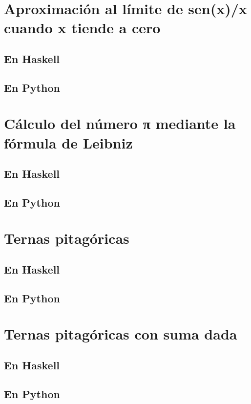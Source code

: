 \documentclass[a4paper,12pt,twoside]{book}
\begin{document}
\section{Aproximación al límite de sen(x)/x cuando x tiende a cero}
\subsection*{En Haskell}
\subsection*{En Python}

\section{Cálculo del número π mediante la fórmula de Leibniz}
\subsection*{En Haskell}
\subsection*{En Python}

\section{Ternas pitagóricas}
\subsection*{En Haskell}
\subsection*{En Python}

\section{Ternas pitagóricas con suma dada}
\subsection*{En Haskell}
\subsection*{En Python}
\end{document}
